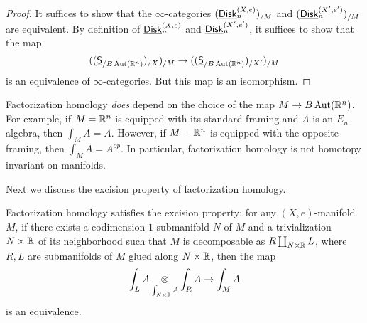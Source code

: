 \documentclass[twoside]{article}
\begin{document}
\begin{proof}
It suffices to show that the $\infty$-categories $(\underline{\smash{\mathsf{Disk}}}_n^{(X,e)})_{/M}$
and $(\underline{\smash{\mathsf{Disk}}}_n^{(X',e')})_{/M}$ are equivalent. By definition of 
$\underline{\smash{\mathsf{Disk}}}_n^{(X,e)}$ and $\underline{\smash{\mathsf{Disk}}}_n^{(X',e')}$, it suffices to show that
the map $$((\underline{\smash{\mathsf{S}}}_{/B\operatorname{Aut}(\mathbb{R}^n)})_{/X})_{/M}\to((\underline{\smash{\mathsf{S}}}_{/B\operatorname{Aut}(\mathbb{R}^n)})_{/X'})_{/M}$$
is an equivalence of $\infty$-categories. But this map is an isomorphism.
\end{proof}

\begin{remark}
Factorization homology \textit{does} depend on the choice of the map 
$M\to B\operatorname{Aut}(\mathbb{R}^n)$. For example, if $M=\mathbb{R}^n$ is equipped with its standard
framing and $A$ is an $E_n$-algebra, then $\int_MA=A$. However, if $M=\mathbb{R}^n$
is equipped with the opposite framing, then $\int_MA=A^{op}$.
In particular, factorization homology is not homotopy invariant on manifolds.
\end{remark}

Next we discuss the excision property of factorization homology.

\begin{proposition}
    Factorization homology satisfies the excision property:
    for any $(X,e)$-manifold $M$, if there exists a codimension $1$
    submanifold $N$ of $M$ and a trivialization $N\times\mathbb{R}$ of its neighborhood
    such that $M$ is decomposable as $R\coprod_{N\times\mathbb{R}}L$, where $R, L$ are
    submanifolds of $M$ glued along $N\times\mathbb{R}$, then the map
    $$\int_LA\mathop{\operatorname{\otimes}}\limits_{\int_{N\times\mathbb{R}}A}\int_RA\to\int_MA$$ is an equivalence.
\end{proposition}
\end{document}
